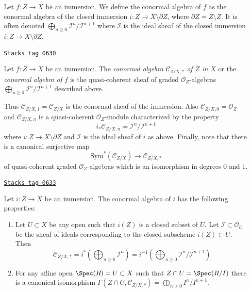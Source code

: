 \medskip\noindent
Let $f : Z \to X$ be an immersion. We define the conormal algebra of $f$
as the conormal algebra of the closed immersion
$i : Z \to X \setminus \partial Z$, where
$\partial Z = \overline{Z} \setminus Z$. It is often denoted
$\bigoplus_{n \geq 0} \mathcal{I}^n/\mathcal{I}^{n + 1}$
where $\mathcal{I}$ is the ideal sheaf
of the closed immersion $i : Z \to X \setminus \partial Z$.

\begin{definition}
\label{divisors-definition-conormal-sheaf}
\href{https://stacks.math.columbia.edu/tag/0630}{\texttt{Stacks tag 0630}}

Let $f : Z \to X$ be an immersion. The {\it conormal algebra
$\mathcal{C}_{Z/X, *}$ of $Z$ in $X$} or the {\it conormal algebra of $f$}
is the quasi-coherent sheaf of graded $\mathcal{O}_Z$-algebras
$\bigoplus_{n \geq 0} \mathcal{I}^n/\mathcal{I}^{n + 1}$ described above.
\end{definition}

Thus $\mathcal{C}_{Z/X, 1} = \mathcal{C}_{Z/X}$ is the conormal sheaf
of the immersion. Also $\mathcal{C}_{Z/X, 0} = \mathcal{O}_Z$ and
$\mathcal{C}_{Z/X, n}$ is a quasi-coherent $\mathcal{O}_Z$-module
characterized by the property
\begin{equation}
\label{equation-conormal-in-degree-n}
i_*\mathcal{C}_{Z/X, n} = \mathcal{I}^n/\mathcal{I}^{n + 1}
\end{equation}
where $i : Z \to X \setminus \partial Z$ and $\mathcal{I}$ is the ideal
sheaf of $i$ as above. Finally, note that there is a canonical surjective
map
\begin{equation}
\label{equation-conormal-algebra-quotient}
\text{Sym}^*(\mathcal{C}_{Z/X}) \longrightarrow \mathcal{C}_{Z/X, *}
\end{equation}
of quasi-coherent graded $\mathcal{O}_Z$-algebras which is an isomorphism
in degrees $0$ and $1$.

\begin{lemma}
\label{divisors-lemma-affine-conormal-sheaf}
\href{https://stacks.math.columbia.edu/tag/0633}{\texttt{Stacks tag 0633}}

Let $i : Z \to X$ be an immersion. The conormal algebra
of $i$ has the following properties:
\begin{enumerate}
\item Let $U \subset X$ be any open such that $i(Z)$ is
a closed subset of $U$. Let $\mathcal{I} \subset \mathcal{O}_U$
be the sheaf of ideals corresponding to the closed subscheme
$i(Z) \subset U$. Then
$$
\mathcal{C}_{Z/X, *} =
i^*\left(\bigoplus\nolimits_{n \geq 0} \mathcal{I}^n\right) =
i^{-1}\left(
\bigoplus\nolimits_{n \geq 0} \mathcal{I}^n/\mathcal{I}^{n + 1}
\right)
$$
\item
For any affine open $\Spec(R) = U \subset X$
such that $Z \cap U = \Spec(R/I)$ there is a
canonical isomorphism
$\Gamma(Z \cap U, \mathcal{C}_{Z/X, *}) = \bigoplus_{n \geq 0} I^n/I^{n + 1}$.
\end{enumerate}
\end{lemma}


